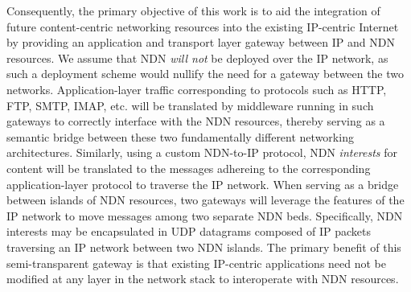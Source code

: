 Consequently, the primary objective of this work is to aid the integration of future content-centric networking resources into the existing IP-centric Internet by providing an application and transport layer gateway between IP and NDN resources. We assume that NDN \emph{will not} be deployed over the IP network, as such a deployment scheme would nullify the need for a gateway between the two networks. Application-layer traffic corresponding to protocols such as HTTP, FTP, SMTP, IMAP, etc. will be translated by middleware running in such gateways to correctly interface with the NDN resources, thereby serving as a semantic bridge between these two fundamentally different networking architectures. Similarly, using a custom NDN-to-IP protocol, NDN \emph{interests} for content will be translated to the messages adhereing to the corresponding application-layer protocol to traverse the IP network. When serving as a bridge between islands of NDN resources, two gateways will leverage the features of the IP network to move messages among two separate NDN beds. Specifically, NDN interests may be encapsulated in UDP datagrams composed of IP packets traversing an IP network between two NDN islands. The primary benefit of this semi-transparent gateway is that existing IP-centric applications need not be modified at any layer in the network stack to interoperate with NDN resources. 




